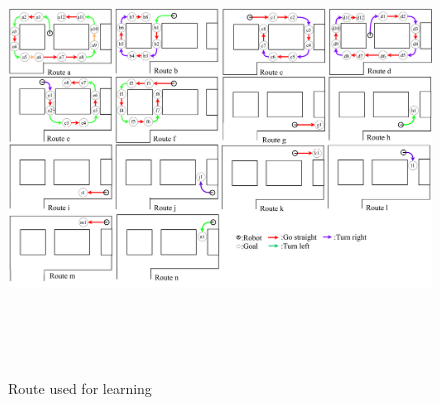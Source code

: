 \documentclass{sice-si}
\begin{document}
\printbibliography[title=参考文献]
\begin{figure}[t]
    \centering
     \includegraphics[height=120mm,width=160mm]{./figs/newroute.pdf}
     \caption{Route used for learning}\label{fig:newroute}
\end{figure}
\end{document}
